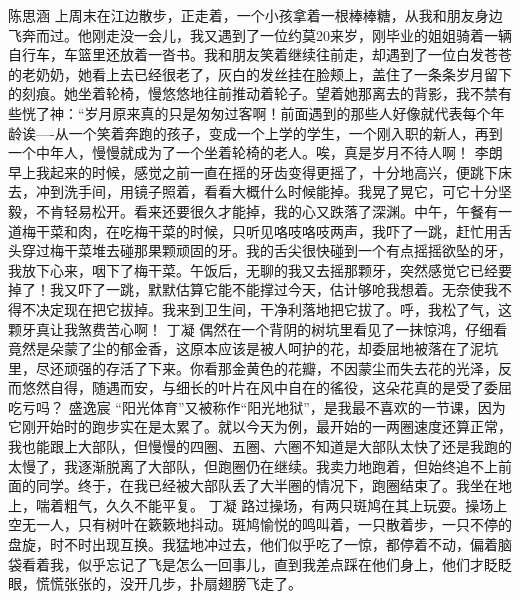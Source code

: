 {}\markdownRendererInterblockSeparator
{}陈思涵\markdownRendererInterblockSeparator
{}上周末在江边散步，正走着，一个小孩拿着一根棒棒糖，从我和朋友身边飞奔而过。他刚走没一会儿，我又遇到了一位约莫20来岁，刚毕业的姐姐骑着一辆自行车，车篮里还放着一沓书。我和朋友笑着继续往前走，却遇到了一位白发苍苍的老奶奶，她看上去已经很老了，灰白的发丝挂在脸颊上，盖住了一条条岁月留下的刻痕。她坐着轮椅，慢悠悠地往前推动着轮子。望着她那离去的背影，我不禁有些恍了神：“岁月原来真的只是匆匆过客啊！前面遇到的那些人好像就代表每个年龄诶----从一个笑着奔跑的孩子，变成一个上学的学生，一个刚入职的新人，再到一个中年人，慢慢就成为了一个坐着轮椅的老人。唉，真是岁月不待人啊！\markdownRendererInterblockSeparator
{}\markdownRendererInterblockSeparator
{}李朗\markdownRendererInterblockSeparator
{}早上我起来的时候，感觉之前一直在摇的牙齿变得更摇了，十分地高兴，便跳下床去，冲到洗手间，用镜子照着，看看大概什么时候能掉。我晃了晃它，可它十分坚毅，不肯轻易松开。看来还要很久才能掉，我的心又跌落了深渊。中午，午餐有一道梅干菜和肉，在吃梅干菜的时候，只听见咯吱咯吱两声，我吓了一跳，赶忙用舌头穿过梅干菜堆去碰那果颗顽固的牙。我的舌尖很快碰到一个有点摇摇欲坠的牙，我放下心来，咽下了梅干菜。午饭后，无聊的我又去摇那颗牙，突然感觉它已经要掉了！我又吓了一跳，默默估算它能不能撑过今天，估计够呛我想着。无奈使我不得不决定现在把它拔掉。我来到卫生间，干净利落地把它拔了。呼，我松了气，这颗牙真让我煞费苦心啊！\markdownRendererInterblockSeparator
{}\markdownRendererInterblockSeparator
{}丁凝\markdownRendererInterblockSeparator
{}偶然在一个背阴的树坑里看见了一抹惊鸿，仔细看竟然是朵蒙了尘的郁金香，这原本应该是被人呵护的花，却委屈地被落在了泥坑里，尽还顽强的存活了下来。你看那金黄色的花瓣，不因蒙尘而失去花的光泽，反而悠然自得，随遇而安，与细长的叶片在风中自在的徭役，这朵花真的是受了委屈吃亏吗？\markdownRendererInterblockSeparator
{}\markdownRendererInterblockSeparator
{}盛逸宸\markdownRendererInterblockSeparator
{}“阳光体育”又被称作“阳光地狱”，是我最不喜欢的一节课，因为它刚开始时的跑步实在是太累了。就以今天为例，最开始的一两圈速度还算正常，我也能跟上大部队，但慢慢的四圈、五圈、六圈\markdownRendererEllipsis{}\markdownRendererEllipsis{}不知道是大部队太快了还是我跑的太慢了，我逐渐脱离了大部队，但跑圈仍在继续。我卖力地跑着，但始终追不上前面的同学。终于，在我已经被大部队丢了大半圈的情况下，跑圈结束了。我坐在地上，喘着粗气，久久不能平复。\markdownRendererInterblockSeparator
{}\markdownRendererInterblockSeparator
{}丁凝\markdownRendererInterblockSeparator
{}路过操场，有两只斑鸠在其上玩耍。操场上空无一人，只有树叶在簌簌地抖动。斑鸠愉悦的鸣叫着，一只散着步，一只不停的盘旋，时不时出现互换。我猛地冲过去，他们似乎吃了一惊，都停着不动，偏着脑袋看着我，似乎忘记了飞是怎么一回事儿，直到我差点踩在他们身上，他们才眨眨眼，慌慌张张的，没开几步，扑扇翅膀飞走了。\markdownRendererDocumentEnd